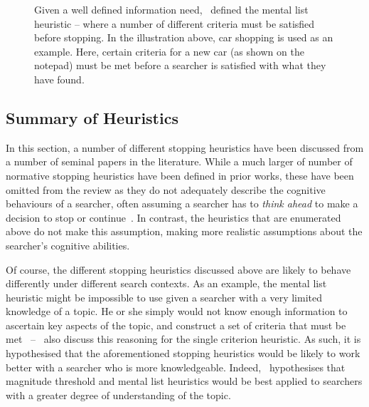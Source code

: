 \begin{figure}[t!]
    \centering
    \caption[The mental list stopping heuristic]{Given a well defined information need,~\cite{nickles1995judgment} defined the mental list heuristic – where a number of different criteria must be satisfied before stopping. In the illustration above, car shopping is used as an example. Here, certain criteria for a new car (as shown on the notepad) must be met before a searcher is satisfied with what they have found.}
    \label{fig:mental_list}
\end{figure}

\subsection{Summary of Heuristics}
In this section, a number of different stopping heuristics have been discussed from a number of seminal papers in the literature. While a much larger of number of normative stopping heuristics have been defined in prior works, these have been omitted from the review as they do not adequately describe the cognitive behaviours of a searcher, often assuming a searcher has to \emph{think ahead} to make a decision to stop or continue~\citep{browne2004stopping_rules}. In contrast, the heuristics that are enumerated above do not make this assumption, making more realistic assumptions about the searcher's cognitive abilities.

Of course, the different stopping heuristics discussed above are likely to behave differently under different search contexts. As an example, the mental list heuristic might be impossible to use given a searcher with a very limited knowledge of a topic. He or she simply would not know enough information to ascertain key aspects of the topic, and construct a set of criteria that must be met~\citep{browne2005stopping_rules} --~\cite{gigerenzer1999betting} also discuss this reasoning for the single criterion heuristic. As such, it is hypothesised that the aforementioned stopping heuristics would be likely to work better with a searcher who is more knowledgeable. Indeed,~\cite{browne2005stopping_rules} hypothesises that magnitude threshold and mental list heuristics would be best applied to searchers with a greater degree of understanding of the topic.

